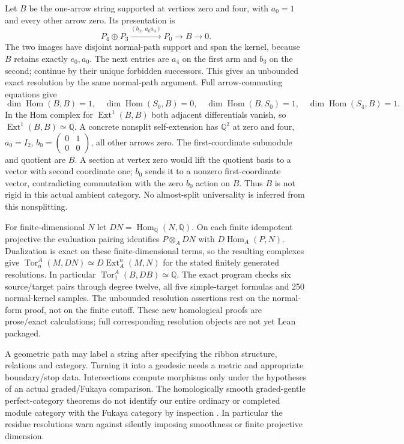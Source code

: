 \documentclass[11pt]{article}
\theoremstyle{definition}\newtheorem{definition}[theorem]{Definition}
\theoremstyle{remark}\newtheorem{remark}[theorem]{Remark}
\begin{document}
Let $B$ be the one-arrow string supported at vertices zero and four, with
$a_0=1$ and every other arrow zero. Its presentation is
\[
 P_4\oplus P_3\xrightarrow{(b_0,\ a_0a_4)}P_0\longrightarrow B\longrightarrow0.
\]
The two images have disjoint normal-path support and span the kernel,
because $B$ retains exactly $e_0,a_0$. The next entries are $a_4$ on the
first arm and $b_3$ on the second; continue by their unique forbidden successors.
This gives an unbounded exact resolution by the same normal-path argument.
Full arrow-commuting equations give
\[
 \dim\operatorname{Hom}(B,B)=1,\quad
 \dim\operatorname{Hom}(S_0,B)=0,\quad
 \dim\operatorname{Hom}(B,S_0)=1,\quad
 \dim\operatorname{Hom}(S_4,B)=1.
\]
In the Hom complex for $\operatorname{Ext}^1(B,B)$ both adjacent
differentials vanish, so $\operatorname{Ext}^1(B,B)\simeq\mathbb Q$.
A concrete nonsplit self-extension has $\mathbb Q^2$ at zero and four,
$a_0=I_2$, $b_0=\left(\begin{smallmatrix}0&1\\0&0\end{smallmatrix}\right)$,
all other arrows zero. The first-coordinate submodule and quotient are $B$.
A section at vertex zero would lift the quotient basis to a vector with
second coordinate one; $b_0$ sends it to a nonzero first-coordinate vector,
contradicting commutation with the zero $b_0$ action on $B$. Thus $B$ is
not rigid in this actual ambient category. No almost-split universality
is inferred from this nonsplitting.

For finite-dimensional $N$ let $DN=\operatorname{Hom}_{\mathbb Q}(N,\mathbb Q)$.
On each finite idempotent projective the evaluation pairing identifies
$P\otimes_A DN$ with $D\operatorname{Hom}_A(P,N)$.
Dualization is exact on these finite-dimensional terms, so the resulting
complexes give
$\operatorname{Tor}^A_n(M,DN)\simeq D\operatorname{Ext}^n_A(M,N)$
for the stated finitely generated resolutions. In particular
$\operatorname{Tor}_1^A(B,DB)\simeq\mathbb Q$.
The exact program checks six source/target pairs through degree twelve,
all five simple-target formulas and 250 normal-kernel samples. The
unbounded resolution assertions rest on the normal-form proof, not on the
finite cutoff. These new homological proofs are prose/exact calculations;
full corresponding resolution objects are not yet Lean packaged.

A geometric path may label a string after specifying the ribbon structure,
relations and category. Turning it into a geodesic needs a metric and
appropriate boundary/stop data. Intersections compute morphisms only under
the hypotheses of an actual graded/Fukaya comparison. The homologically
smooth graded-gentle perfect-category theorems do not identify our entire
ordinary or completed module category with the Fukaya category by inspection
\cite{LFFukaya}. In particular the residue resolutions warn against
silently imposing smoothness or finite projective dimension.
\end{document}
